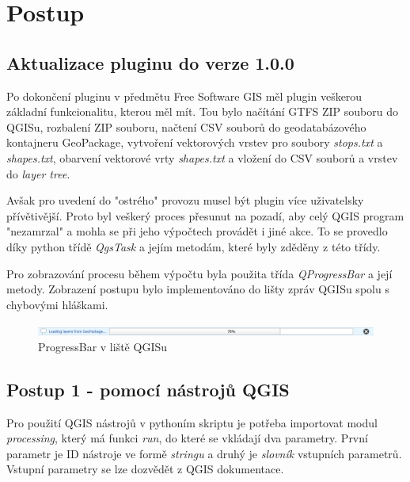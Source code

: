 \chapter{Postup}
\label{5-postup}

\section{Aktualizace pluginu do verze 1.0.0}
Po dokončení pluginu v předmětu Free Software GIS měl plugin veškerou základní 
funkcionalitu, kterou měl mít. Tou bylo načítání GTFS ZIP souboru do QGISu,
rozbalení ZIP souboru, načtení CSV souborů do geodatabázového kontajneru GeoPackage,
vytvoření vektorových vrstev pro soubory \textit{stops.txt} a \textit{shapes.txt},
obarvení vektorové vrty \textit{shapes.txt} a vložení do CSV souborů a vrstev do
\textit{layer tree}.

Avšak pro uvedení do "ostrého" provozu musel být plugin více uživatelsky přívětivější.
Proto byl veškerý proces přesunut na pozadí, aby celý QGIS program "nezamrzal" a
mohla se při jeho výpočtech provádět i jiné akce. To se provedlo díky python třídě \textit{QgsTask}
a jejím metodám, které byly zděděny z této třídy. \cite{QgsTask}

Pro zobrazování procesu během výpočtu byla použita třída \textit{QProgressBar} a její metody.
Zobrazení postupu bylo implementováno do lišty zpráv QGISu spolu s chybovými hláškami.

\begin{figure}[H] \centering
    \includegraphics[width=400pt]{./pictures/loading.png}
    \caption[ProgressBar]{ProgressBar v liště QGISu}
	\label{fig:ProgressBar v liště QGISu}              
\end{figure}     


\section{Postup 1 - pomocí nástrojů QGIS}

Pro použití QGIS nástrojů v pythoním skriptu je potřeba importovat modul \textit{processing},
který má funkci \textit{run}, do které se vkládají dva parametry. První parametr je ID nástroje
ve formě \textit{stringu} a druhý je \textit{slovník} vstupních parametrů. Vstupní parametry se lze dozvědět
z QGIS dokumentace. \cite{QGIS_docs}

